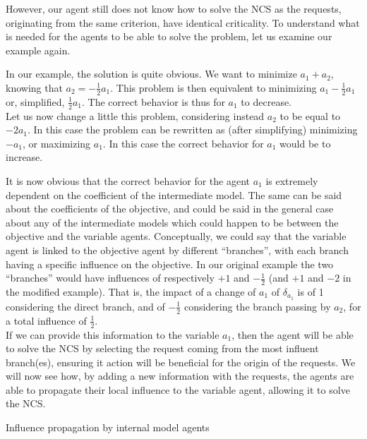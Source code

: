 However, our agent still does not know how to solve the NCS as the requests, originating from the same criterion, have identical criticality. To understand what is needed for the agents to be able to solve the problem, let us examine our example again.

In our example, the solution is quite obvious. We want to minimize $a_1 + a_2$, knowing that $a_2 = -\frac{1}{2}a_1$. This problem is then equivalent to minimizing $a_1-\frac{1}{2}a_1$ or, simplified, $\frac{1}{2}a_1$. The correct behavior is thus for $a_1$ to decrease.\\
Let us now change a little this problem, considering instead $a_2$ to be equal to $ -2a_1$. In this case the problem can be rewritten as (after simplifying) minimizing $-a_1$, or maximizing $a_1$. In this case the correct behavior for $a_1$ would be to increase.

It is now obvious that the correct behavior for the agent $a_1$ is extremely dependent on the coefficient of the intermediate model. The same can be said about the coefficients of the objective, and could be said in the general case about any of the intermediate models which could happen to be between the objective and the variable agents. Conceptually, we could say that the variable agent is linked to the objective agent by different \enquote{branches}, with each branch having a specific influence on the objective. In our original example the two \enquote{branches} would have influences of respectively $+1$ and $-\frac{1}{2}$ (and $+1$ and $-2$ in the modified example). That is, the impact of a change of $a_1$ of $\delta_{a_1}$ is of 1 considering the direct branch, and of $-\frac{1}{2}$ considering the branch passing by $a_2$, for a total influence of $\frac{1}{2}$.\\
If we can provide this information to the variable $a_1$, then the agent will be able to solve the NCS by selecting the request coming from the most influent branch(es), ensuring it action will be beneficial for the origin of the requests. We will now see how, by adding a new information with the requests, the agents are able to propagate their local influence to the variable agent, allowing it to solve the NCS.

\begin{algorithm}
\caption{Influence propagation by internal model agents}
\label{algo_hidden_dependency_influence_propagation}

	

\end{algorithm}


